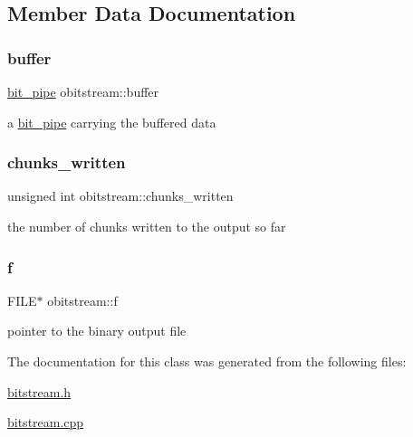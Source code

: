 \subsection{Member Data Documentation}
\mbox{\label{classobitstream_aeaccad00a395a404aa16472bfa052be3}} 
\subsubsection{\texorpdfstring{buffer}{buffer}}
{\footnotesize\ttfamily \hyperlink{classbit__pipe}{bit\+\_\+pipe} obitstream\+::buffer\hspace{0.3cm}{\ttfamily [private]}}



a \hyperlink{classbit__pipe}{bit\+\_\+pipe} carrying the buffered data 

\mbox{\label{classobitstream_a3022397f2b6133ea5990016d9d078a2f}} 
\subsubsection{\texorpdfstring{chunks\+\_\+written}{chunks\_written}}
{\footnotesize\ttfamily unsigned int obitstream\+::chunks\+\_\+written\hspace{0.3cm}{\ttfamily [private]}}



the number of chunks written to the output so far 

\mbox{\label{classobitstream_ac589d74745217748c888ae777ab324a7}} 
\subsubsection{\texorpdfstring{f}{f}}
{\footnotesize\ttfamily F\+I\+LE$\ast$ obitstream\+::f\hspace{0.3cm}{\ttfamily [private]}}

pointer to the binary output file 

The documentation for this class was generated from the following files\+:\begin{DoxyCompactItemize}
\item 
\hyperlink{bitstream_8h}{bitstream.\+h}\item 
\hyperlink{bitstream_8cpp}{bitstream.\+cpp}\end{DoxyCompactItemize}
